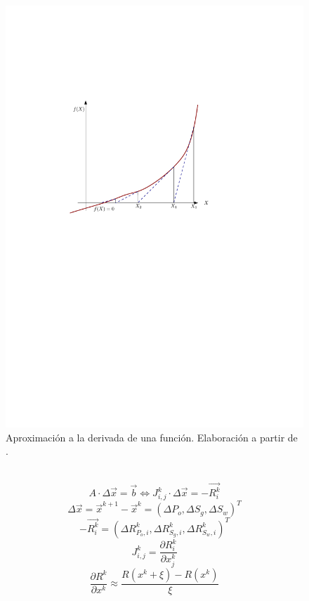 \begin{figure}[h]
	\centering%
	\includegraphics[scale=0.8]{Fig/NewtonR.pdf}%
	\caption[Aproximación a la derivada de una función.]{Aproximación a la derivada de una función. Elaboración a partir de .} \label{fig:NewtonR}
\end{figure}
~\\
\begin{equation}
A \cdot {\Delta \vec{x}} = \vec{b} \Leftrightarrow J^{k}_{i,j} \cdot {\Delta \vec{x}} = -\vec{R^{k}_{i}}
\end{equation}
\begin{equation}
\Delta \vec{x} = \vec{x}^{k+1} - \vec{x}^{k} = \left(\Delta P_o, \Delta S_g, \Delta S_w \right)^T
\end{equation}
\begin{equation}
-\vec{R^k_i} = \left(\Delta R^k_{P_o,i}, \Delta R^k_{S_g,i}, \Delta R^k_{S_w,i} \right)^T
\end{equation}
\begin{equation}
J^k_{i,j}=\frac{\partial R^k_i}{\partial x^k_j}	
\end{equation}
\begin{equation}
\frac{\partial R^k}{\partial x^k} \approx \frac{R\left(x^k + \xi \right) - R\left(x^k \right)}{\xi}
\end{equation}

